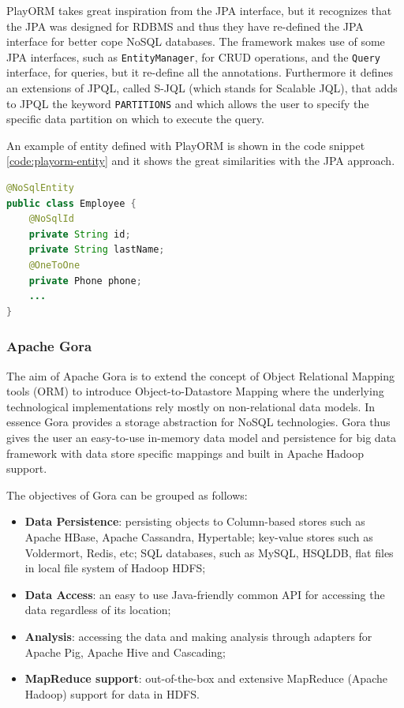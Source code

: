\noindent PlayORM takes great inspiration from the JPA interface, but it  recognizes that the JPA was designed for RDBMS and thus they have re-defined the JPA interface for better cope NoSQL databases.
The framework makes use of some JPA interfaces, such as \texttt{EntityManager}, for CRUD operations, and the \texttt{Query} interface, for queries, but it re-define all the annotations.
Furthermore it defines an extensions of JPQL, called S-JQL (which stands for Scalable JQL), that adds to JPQL the keyword \texttt{PARTITIONS} and which allows the user to specify the specific data partition on which to execute the query.

\noindent An example of entity defined with PlayORM is shown in the code snippet \ref{code:playorm-entity} and it shows the great similarities with the JPA approach.

\begin{lstlisting}[language=Java, caption=PlayORM object mapping, label=code:playorm-entity]
@NoSqlEntity
public class Employee {
    @NoSqlId
    private String id;
    private String lastName;
    @OneToOne
    private Phone phone;
    ...
}
\end{lstlisting}

\subsubsection{Apache Gora}
The aim of Apache Gora \cite{online:apache-gora} is to extend the concept of Object Relational Mapping tools (ORM) to introduce Object-to-Datastore Mapping where the underlying technological implementations rely mostly on non-relational data models. In essence Gora provides a storage abstraction for NoSQL technologies. 
Gora thus gives the user an easy-to-use in-memory data model and persistence for big data framework with data store specific mappings and built in Apache Hadoop support.

\newparagraph The objectives of Gora can be grouped as follows:
\begin{itemize}
\item \textbf{Data Persistence}: persisting objects to Column-based stores such as Apache HBase, Apache Cassandra, Hypertable; key-value stores such as Voldermort, Redis, etc; SQL databases, such as MySQL, HSQLDB, flat files in local file system of Hadoop HDFS; 
\item \textbf{Data Access}: an easy to use Java-friendly common API for accessing the data regardless of its location; 
\item \textbf{Analysis}: accessing the data and making analysis through adapters for Apache Pig, Apache Hive and Cascading;
\item \textbf{MapReduce support}: out-of-the-box and extensive MapReduce (Apache Hadoop) support for data in HDFS.
\end{itemize}

